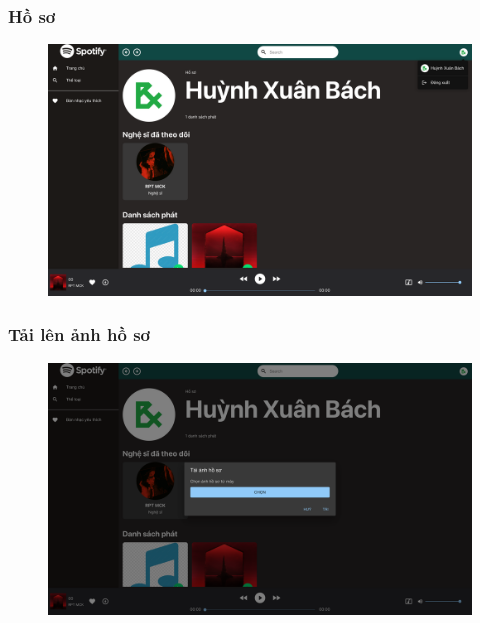 \documentclass[a4paper]{article}
\begin{document}
\subsubsection{Hồ sơ}
\begin{figure}[h!]
\begin{center}
\includegraphics[width=12cm]{profile.png}
\end{center}
\end{figure}

\subsubsection{Tải lên ảnh hồ sơ}
\begin{figure}[h!]
\begin{center}
\includegraphics[width=12cm]{profile_image_upload.png}
\end{center}
\end{figure}
\newpage
\end{document}
